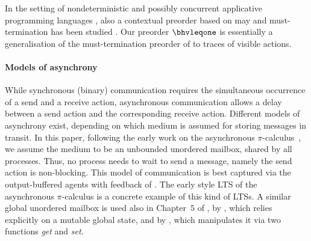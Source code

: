   In the setting of nondeterministic and possibly concurrent
  applicative programming languages
  \cite{DBLP:conf/ppdp/Schmidt-Schauss18,DBLP:journals/corr/abs-2008-13359,birkedal-non-determinism},
  also a contextual preorder based on may and must-termination has
  been studied \cite{DBLP:journals/mscs/SabelS08,birkedal-non-determinism}.
  Our preorder $\bhvleqone$ is essentially a
  generalisation of the must-termination preorder of
  \cite{DBLP:journals/mscs/SabelS08} to traces of visible actions.
  

  
\paragraph{Models of asynchrony}
While synchronous (binary) communication requires
the simultaneous occurrence of a send and a receive action,
asynchronous communication allows a delay between a send action and
the corresponding receive action.  Different models of asynchrony
exist, depending on which medium is assumed for storing messages in
transit. In this paper, following the early work on the asynchronous
$\pi$-calculus~\cite{DBLP:conf/ecoop/HondaT91,boudol:inria-00076939,ACS96},
we assume the medium to be an unbounded
unordered mailbox, shared by all processes. Thus, no process needs to
wait to send a message, namely the send action is non-blocking.
  This model of communication is best captured via the output-buffered
  agents with feedback of \cite{DBLP:conf/concur/Selinger97}. 
  The early style LTS of the asynchronous $\pi$-calculus is a concrete example of this
  kind of LTSs.
A similar global unordered mailbox is used %
also in Chapter~$5$ of \cite{DBLP:phd/us/Thati03}, %
by \cite{Brookes2002DeconstructingCA}, which relies explicitly on a mutable
global state, and by \cite{palamidessi_2003}, which
manipulates it via two functions {\em get} and {\em set}.


